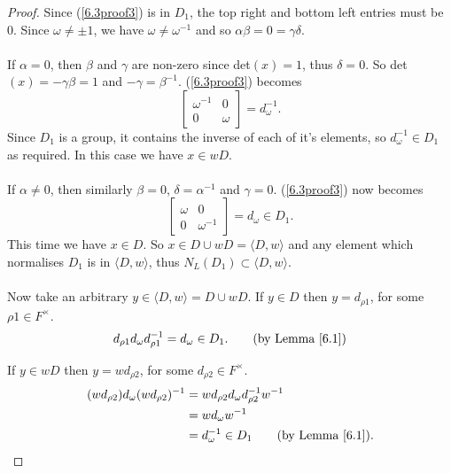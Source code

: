 \begin{proof}
Since (\ref{6.3proof3}) is in $D_1$, the top right and bottom left entries must be 0. Since  $\omega \neq \pm 1$, we have $\omega \neq \omega^{-1}$ and so $\alpha \beta = 0 = \gamma \delta$. \\
\\
 \space If $\alpha = 0$, then $\beta$ and $\gamma$ are non-zero since det$(x) = 1$, thus $\delta = 0$. So det$(x) = \minus \gamma \beta = 1$  and $\minus \gamma = \beta^{-1}$. (\ref{6.3proof3}) becomes $$\begin{bmatrix} \omega^{-1} & 0 \\ 0 & \omega \end{bmatrix} = d^{-1}_\omega.$$Since $D_1$ is a group, it contains the inverse of each of it's elements, so $d^{-1}_\omega \in D_1$ as required. In this case we have $x \in wD$. \\
\\
 \space If $\alpha \neq 0$, then similarly $\beta = 0$, $\delta = \alpha^{-1}$ and $\gamma = 0$. (\ref{6.3proof3}) now becomes $$\begin{bmatrix} \omega & 0 \\ 0 & \omega^{-1} \end{bmatrix} = d_\omega \in D_1.$$This time we have $x \in D$. So $x \in D \cup wD = \langle D , w \rangle$ and any element which normalises $D_1$ is in $\langle D , w \rangle$, thus $N_L(D_1) \subset \langle D , w \rangle$. \\
\\
Now take an arbitrary $y \in \langle D , w \rangle = D \cup wD$. If $y \in D$ then $y = d_{\rho 1}$, for some $\rho 1 \in F^\times$.
\begin{align*} d_{\rho 1} d_\omega d^{-1}_{\rho 1} = d_\omega \in D_1. \tag{by Lemma \ref{6.1}}
\end{align*}

If $y \in wD$ then $y = w d_{\rho 2}$, for some $ d_{\rho 2} \in F^\times$.
\begin{align*} (w d_{\rho 2}) d_\omega (w d_{\rho 2})^{-1} &= w d_{\rho 2} d_\omega d^{-1}_{\rho 2} w^{-1}
\\ &= w d_\omega w^{-1}
\\ &= d^{-1}_\omega \in D_1 \tag{by Lemma \ref{6.1}}.
\end{align*}


\end{proof}
